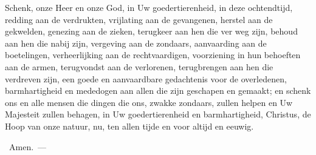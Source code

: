 \documentclass[12pt,twoside,a5paper]{article}
\begin{document}


\begin{halfparskip}
  Schenk, onze Heer en onze God, in Uw goedertierenheid, in deze ochtendtijd, redding aan de verdrukten, vrijlating aan de gevangenen, herstel aan de gekwelden, genezing aan de zieken, terugkeer aan hen die ver weg zijn, behoud aan hen die nabij zijn, vergeving aan de zondaars, aanvaarding aan de boetelingen, verheerlijking aan de rechtvaardigen, voorziening in hun behoeften aan de armen, terugvondst aan de verlorenen, terugbrengen aan hen die verdreven zijn, een goede en aanvaardbare gedachtenis voor de overledenen, barmhartigheid en mededogen aan allen die zijn geschapen en gemaakt; en schenk ons en alle mensen die dingen die ons, zwakke zondaars, zullen helpen en Uw Majesteit zullen behagen, in Uw goedertierenheid en barmhartigheid, Christus, de Hoop van onze natuur, nu, ten allen tijde en voor altijd en eeuwig.
\end{halfparskip}

\begin{halfparskip}
  \rr~Amen.~--- 
\end{halfparskip}

\end{document}
